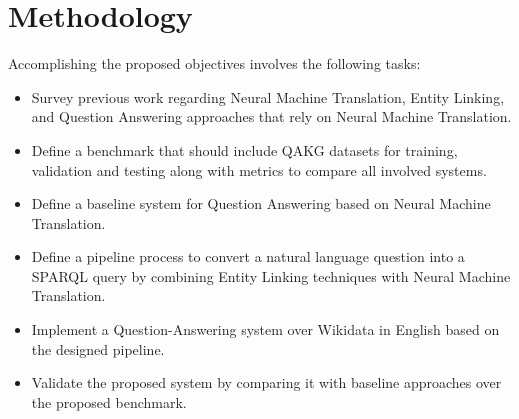 \section{Methodology}
Accomplishing the proposed objectives involves the following tasks:
\begin{itemize}
    \item Survey previous work regarding Neural Machine Translation, Entity Linking, and 
    Question Answering approaches that rely on Neural Machine Translation.
    \item Define a benchmark that should include QAKG datasets for training, validation and 
    testing along with metrics to compare all involved systems.
    \item Define a baseline system for Question Answering based on Neural Machine Translation.
    \item Define a pipeline process to convert a natural language question into a SPARQL query 
    by combining Entity Linking techniques with Neural Machine Translation.
    \item Implement a Question-Answering system over Wikidata in English based on the designed pipeline.
    \item Validate the proposed system by comparing it with baseline approaches over the 
    proposed benchmark.
\end{itemize}
